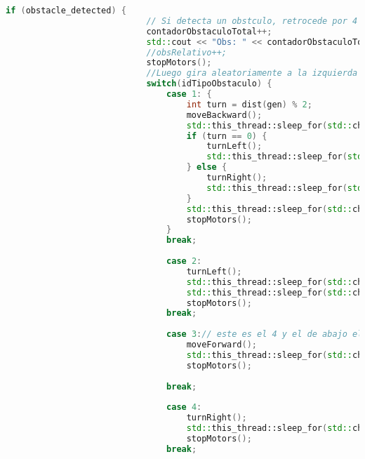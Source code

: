 \begin{lstlisting}[language={C++}, caption={Quinto ajuste de c\'odigo}, label={QuintoAjuste}]
                        if (obstacle_detected) {
                            // Si detecta un obstculo, retrocede por 4 segundos
                            contadorObstaculoTotal++;
                            std::cout << "Obs: " << contadorObstaculoTotal << std::endl;
                            //obsRelativo++;
                            stopMotors();
                            //Luego gira aleatoriamente a la izquierda o derecha
                            switch(idTipoObstaculo) {
                                case 1: {
                                    int turn = dist(gen) % 2;
                                    moveBackward();
                                    std::this_thread::sleep_for(std::chrono::seconds(5));
                                    if (turn == 0) {
                                        turnLeft();
                                        std::this_thread::sleep_for(std::chrono::seconds(5));
                                    } else {
                                        turnRight();
                                        std::this_thread::sleep_for(std::chrono::seconds(5));
                                    }
                                    std::this_thread::sleep_for(std::chrono::seconds(2));
                                    stopMotors();
                                }
                                break;
                                
                                case 2:
                                    turnLeft();
                                    std::this_thread::sleep_for(std::chrono::seconds(5));
                                    std::this_thread::sleep_for(std::chrono::seconds(2));
                                    stopMotors();
                                break;
                                
                                case 3:// este es el 4 y el de abajo el 3
                                    moveForward();
                                    std::this_thread::sleep_for(std::chrono::seconds(2));
                                    stopMotors();
                                    
                                break;
                                
                                case 4:
                                    turnRight();
                                    std::this_thread::sleep_for(std::chrono::seconds(7));
                                    stopMotors();
                                break;
                                

\end{lstlisting}
